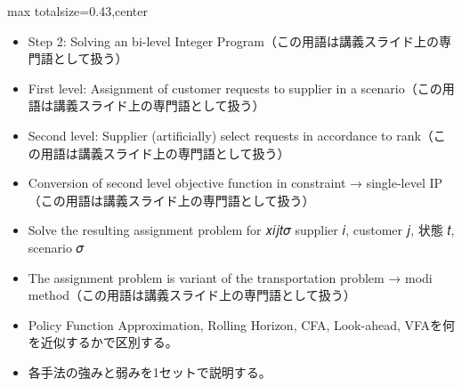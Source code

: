 \clearpage
{}
\begin{minipage}[t]{0.405\textwidth}
\begin{adjustbox}{max totalsize={\textwidth}{0.43\textheight},center}
\begin{minipage}{\textwidth}\scriptsize
{}\begin{itemize}
\item Step 2: Solving an bi-level Integer Program（この用語は講義スライド上の専門語として扱う）
\item First level: Assignment of customer requests to supplier in a scenario（この用語は講義スライド上の専門語として扱う）
\item Second level: Supplier (artificially) select requests in accordance to rank（この用語は講義スライド上の専門語として扱う）
\item Conversion of second level objective function in constraint → single-level IP（この用語は講義スライド上の専門語として扱う）
\item Solve the resulting assignment problem for 𝑥𝑖𝑗𝑡𝜎 supplier 𝑖, customer 𝑗, 状態 𝑡, scenario 𝜎
\item The assignment problem is variant of the transportation problem → modi method（この用語は講義スライド上の専門語として扱う）
\end{itemize}\begin{itemize}
\item Policy Function Approximation, Rolling Horizon, CFA, Look-ahead, VFAを何を近似するかで区別する。
\item 各手法の強みと弱みを1セットで説明する。
\end{itemize}
\end{minipage}
\end{adjustbox}
\end{minipage}\hfill
